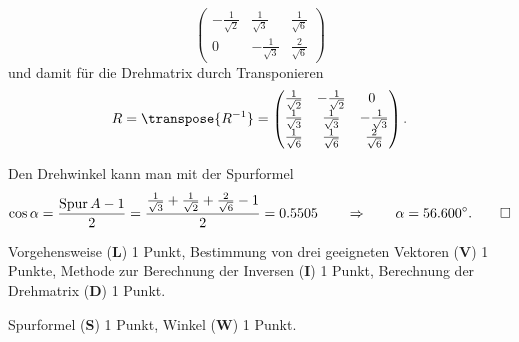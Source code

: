 \begin{loesung}
\begin{teilaufgaben}
\[\begin{pmatrix}
-\frac{1}{\sqrt{2}}& \frac{1}{\sqrt{3}}&\frac{1}{\sqrt{6}}\\
       0           &-\frac{1}{\sqrt{3}}&\frac{2}{\sqrt{6}}
\end{pmatrix}
\]
und damit für die Drehmatrix durch Transponieren
\[
R
=
\transpose{R^{-1}}
=
\begin{pmatrix}
\frac{1}{\sqrt{2}}&-\frac{1}{\sqrt{2}}&       0           \\
\frac{1}{\sqrt{3}}& \frac{1}{\sqrt{3}}&-\frac{1}{\sqrt{3}}\\
\frac{1}{\sqrt{6}}& \frac{1}{\sqrt{6}}& \frac{2}{\sqrt{6}}
\end{pmatrix}.
\]

\item
Den Drehwinkel kann man mit der Spurformel
\[
\cos\alpha
=
\frac{\operatorname{Spur}A-1}{2}
=
\frac{\frac{1}{\sqrt{3}}+\frac{1}{\sqrt{2}}+\frac{2}{\sqrt{6}}-1}{2}
=
0.5505
\qquad\Rightarrow\qquad
\alpha = 56.600^\circ.
\qedhere
\]
\end{teilaufgaben}
\end{loesung}

\begin{bewertung}
\begin{teilaufgaben}
\item
Vorgehensweise ({\bf L}) 1 Punkt,
Bestimmung von drei geeigneten Vektoren ({\bf V}) 1 Punkte,
Methode zur Berechnung der Inversen ({\bf I}) 1 Punkt,
Berechnung der Drehmatrix ({\bf D}) 1 Punkt.
\item
Spurformel ({\bf S}) 1 Punkt,
Winkel ({\bf W}) 1 Punkt.
\end{teilaufgaben}
\end{bewertung}

